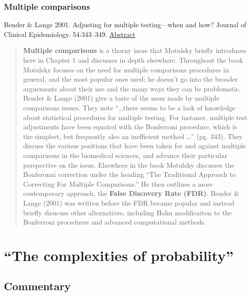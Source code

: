 \documentclass[]{book}
\theoremstyle{definition}
\theoremstyle{definition}
\theoremstyle{definition}
\theoremstyle{remark}
\begin{document}
\subsection{Multiple comparisons}\label{multiple-comparisons}

Bender \& Lange 2001. Adjusting for multiple testing---when and how?
Journal of Clinical Epidemiology. 54:343--349.
\href{https://www.jclinepi.com/article/S0895-4356(00)00314-0/abstract?code=jce-site}{Abstract}

\begin{quote}
\textbf{Multiple comparisons} is a thorny issue that Motulsky briefly
introduces here in Chapter 1 and discusses in depth elsewhere.
Throughout the book Motulsky focuses on the need for multiple
comparisons procedures in general, and the most popular ones used; he
doesn't go into the broader arguements about their use and the many ways
they can be problematic. Bender \& Lange (2001) give a taste of the mess
made by multiple comparisons issues. They note ``\ldots{}there seems to
be a lack of knowledge about statistical procedures for multiple
testing. For instance, multiple test adjustments have been equated with
the Bonferroni procedure, which is the simplest, but frequently also an
inefficient method \ldots{}'' (pg. 343). They discuss the various
positions that have been taken for and against multiple comparisons in
the biomedical sciences, and advance their particular perspective on the
issue. Elsewhere in the book Motulsky discusses the Bonferonni
correction under the heading ``The Traditional Approach to Correcting
For Multiple Comparisons.'' He then outlines a more contemporary
approach, the \textbf{False Discovery Rate (FDR)}. Bender \& Lange
(2001) was written before the FDR became popular and instead briefly
disucuss other alternatives, including Holm modificaiton to the
Bonferroni procedures and advanced computational methods.
\end{quote}

\chapter{\texorpdfstring{``The complexities of
probability''}{The complexities of probability}}\label{ch2}

\section*{Commentary}\label{commentary-1}
\end{document}
